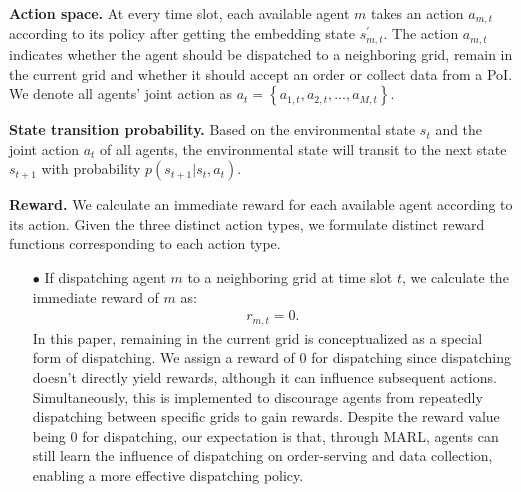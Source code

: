\noindent\textbf{Action space.}
At every time slot, each available agent $m$ takes an action $a_{m,t}$ according to its policy after getting the embedding state $s^{\prime}_{m,t}$. The action $a_{m,t}$ indicates whether the agent should be dispatched to a neighboring grid, remain in the current grid and whether it should accept an order or collect data from a PoI. We denote all agents' joint action as $a_t = \left\{a_{1,t}, a_{2,t}, ..., a_{M,t}\right\}$.


\noindent\textbf{State transition probability.}
Based on the environmental state $s_t$ and the joint action $a_t$ of all agents, the environmental state will transit to the next state $s_{t+1}$ with probability $p(s_{t+1}|s_t, a_t)$.

\noindent\textbf{Reward.}
We calculate an immediate reward for each available agent according to its action. Given the three distinct action types, we formulate distinct reward functions corresponding to each action type.

\begin{itemize}
\item[$\bullet$] If dispatching agent $m$ to a neighboring grid at time slot $t$, we calculate the immediate reward of $m$ as: 
\begin{align}
    r_{m,t} = 0.
\end{align}
In this paper, remaining in the current grid is conceptualized as a special form of dispatching. We assign a reward of 0 for dispatching since dispatching doesn't directly yield rewards, although it can influence subsequent actions. Simultaneously, this is implemented to discourage agents from repeatedly dispatching between specific grids to gain rewards. Despite the reward value being 0 for dispatching, our expectation is that, through MARL, agents can still learn the influence of dispatching on order-serving and data collection, enabling a more effective dispatching policy.
\end{itemize}


